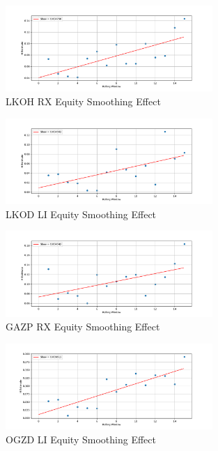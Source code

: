     \begin{figure}[h]
        \centering
        \includegraphics[width=0.7\textwidth]{fig/LKOH RX Equity Smoothing Effect.pdf}
        \caption{LKOH RX Equity Smoothing Effect}
    \end{figure} 

    \begin{figure}[h]
        \centering
        \includegraphics[width=0.7\textwidth]{fig/LKOD LI Equity Smoothing Effect.pdf}
        \caption{LKOD LI Equity Smoothing Effect}
    \end{figure}

    \begin{figure}[h]
        \centering
        \includegraphics[width=0.7\textwidth]{fig/GAZP RX Equity Smoothing Effect.pdf}
        \caption{GAZP RX Equity Smoothing Effect}
    \end{figure} 

    \begin{figure}[h]
        \centering
        \includegraphics[width=0.7\textwidth]{fig/OGZD LI Equity Smoothing Effect.pdf}
        \caption{OGZD LI Equity Smoothing Effect}
    \end{figure} 

